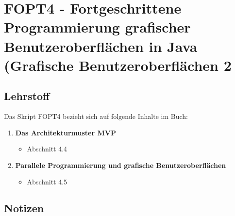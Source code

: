 \chapter{FOPT4 - Fortgeschrittene Programmierung grafischer Benutzeroberflächen in Java (Grafische Benutzeroberflächen 2}

\section{Lehrstoff}

Das Skript FOPT4 bezieht sich auf folgende Inhalte im Buch:

\begin{tcolorbox}[colback=white!20,color=white]
    \begin{enumerate}
        \setcounter{enumi}{0}
        \item \textbf{Das Architekturmuster MVP}
        \begin{itemize}
            \item[] Abschnitt 4.4
        \end{itemize}

        \setcounter{enumi}{3}
        \item \textbf{Parallele Programmierung und grafische Benutzeroberflächen}
        \begin{itemize}
            \item[] Abschnitt 4.5
        \end{itemize}

    \end{enumerate}
\end{tcolorbox}

\newpage





\newpage
\section*{Notizen}

\newpage
